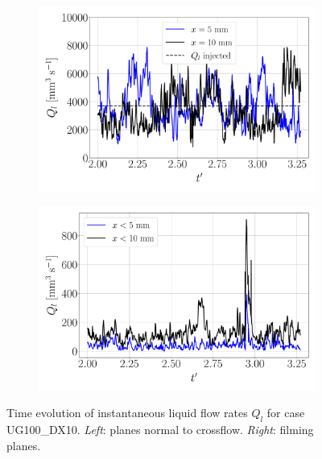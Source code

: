 \begin{figure}[ht]
\flushleft
\begin{subfigure}[b]{0.45\textwidth}
	\centering
   \includegraphics[scale=0.225]{./part2_developments/figures_ch5_resolved_JICF/flow_rates_ibs/inst_Q_iso_x_UG100_dx10}
\end{subfigure}
\hspace{0.4in}
\begin{subfigure}[b]{0.45\textwidth}
	\centering
   \includegraphics[scale=0.225]{./part2_developments/figures_ch5_resolved_JICF/flow_rates_ibs/inst_Q_iso_x_UG100_dx10_filming}
\end{subfigure}
\caption[Instantaneous liquid flow rates $Q_l$ for case UG100\_DX10.]{Time evolution of instantaneous liquid flow rates $Q_l$ for case UG100\_DX10. \textsl{Left}: planes normal to crossflow. \textsl{Right}: filming planes.}
\label{fig:IB_liquid_flow_rate_inst_evolution_UG100_DX10}
\end{figure}


